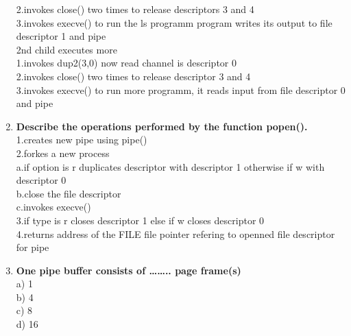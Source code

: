 \documentclass[a4paper,12pt]{article}
\begin{document}
\begin{flushleft}
\begin{enumerate}
{2.invokes close() two times to release descriptors 3 and 4\\
3.invokes execve() to run the ls programm program writes its output to file descriptor 1 and pipe\\
2nd child executes more\\
1.invokes dup2(3,0) now read channel is descriptor 0\\
2.invokes close() two times to release descriptor 3 and 4\\
3.invokes execve() to run more programm, it reads input from file descriptor 0 and pipe}\\
\item \textbf{ Describe the operations performed by the function popen().}\\
{\color{red}1.creates new pipe using pipe()\\
2.forkes a new process\\
a.if option is r duplicates descriptor with descriptor 1 otherwise if w with descriptor 0\\
b.close the file descriptor\\
c.invokes execve()\\
3.if type is r closes descriptor 1 else if w closes descriptor 0\\
4.returns address of the FILE file pointer refering to openned file descriptor for pipe}\\
\item \textbf{ One pipe buffer consists of …….. page frame(s)}\\
{\color{red}a) 1}\\
 b) 4 \\
 c) 8\\
   d) 16\\


\end{enumerate}
\end{flushleft}
\end{document}
